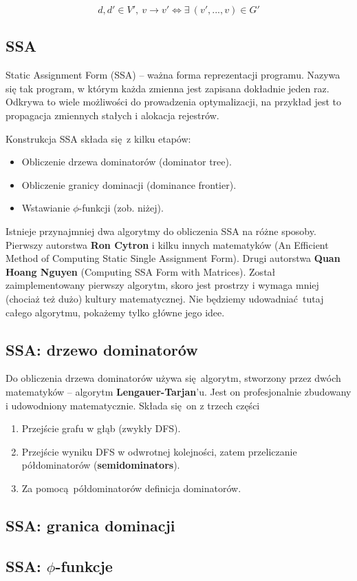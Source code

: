 		$$d, d' \in V', \ v \rightarrow v' \iff \exists \ (v', ..., v) \in G' $$

		\subsection{SSA}
			Static Assignment Form (SSA) -- ważna forma reprezentacji programu. Nazywa się
			tak program, w którym każda zmienna jest zapisana dokładnie jeden raz. Odkrywa
			to wiele możliwości do prowadzenia optymalizacji, na przykład jest to propagacja
			 zmiennych stałych i alokacja rejestrów.

			Konstrukcja SSA składa się z kilku etapów:
			\begin{itemize}
				\item Obliczenie drzewa dominatorów (dominator tree).
				\item Obliczenie granicy dominacji (dominance frontier).
				\item Wstawianie $\phi$-funkcji (zob. niżej).
			\end{itemize}
			Istnieje przynajmniej dwa algorytmy do obliczenia SSA na różne sposoby. Pierwszy
			autorstwa \textbf{Ron Cytron} i kilku innych matematyków (An Efficient
			Method of Computing Static Single Assignment Form). Drugi autorstwa
			\textbf{Quan Hoang Nguyen} (Computing SSA Form with Matrices). Został
			zaimplementowany pierwszy algorytm, skoro jest prostrzy i wymaga mniej (chociaż
			też dużo) kultury matematycznej. Nie będziemy udowadniać tutaj całego algorytmu,
			pokażemy tylko główne jego idee.
			
			\subsection{SSA: drzewo dominatorów}
				Do obliczenia drzewa dominatorów używa się algorytm, stworzony przez dwóch
				matematyków -- algorytm \textbf{Lengauer-Tarjan}'u. Jest on profesjonalnie
				zbudowany i udowodniony matematycznie. Składa się on z trzech części
				\begin{enumerate}
					\item Przejście grafu w głąb (zwykły DFS).
					\item Przejście wyniku DFS w odwrotnej kolejności, zatem przeliczanie
					      półdominatorów (\textbf{semidominators}).
			      	\item Za pomocą półdominatorów definicja dominatorów.
				\end{enumerate}

			\subsection{SSA: granica dominacji}
			
			\subsection{SSA: $\phi$-funkcje}
